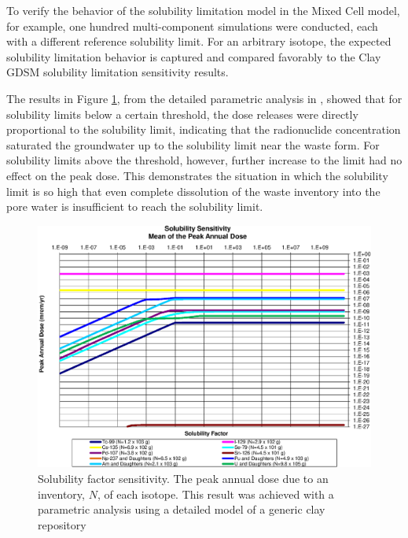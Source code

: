 To verify the behavior of the solubility limitation model in the Mixed Cell
model, for example, one hundred multi-component simulations were conducted,
each with a different reference solubility limit.
For an arbitrary isotope, the expected solubility
limitation behavior is captured and compared favorably to the Clay \gls{GDSM}
solubility limitation sensitivity results.

The results in Figure \ref{fig:SolSumFactor}, from the detailed parametric
analysis in \cite{huff_key_2012}, showed that for solubility limits below a
certain threshold, the dose releases were directly proportional to the
solubility limit, indicating that the radionuclide concentration saturated the
groundwater up to the solubility limit near the waste form.  For solubility
limits above the threshold, however, further increase to the limit had no
effect on the peak dose. This demonstrates the situation in which the
solubility limit is so high that even complete dissolution of the waste
inventory into the pore water is insufficient to reach the solubility limit.


\begin{figure}[ht]
\begin{center}
\includegraphics[width=0.7\linewidth]{./results/images/Solubility_Summary_SolFactor.eps}
\caption[Solubility factor sensitivity in the Clay GDSM model]{Solubility
factor sensitivity. The peak annual dose due to an inventory, $N$, of each
isotope. This result was achieved with a parametric analysis using a detailed
model of a generic clay repository \cite{huff_key_2012}}
\label{fig:SolSumFactor}
\end{center}
\end{figure}

